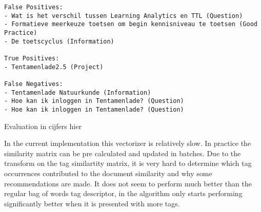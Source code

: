 \begin{lstlisting}
False Positives:
- Wat is het verschil tussen Learning Analytics en TTL (Question)
- Formatieve meerkeuze toetsen om begin kennisniveau te toetsen (Good Practice)
- De toetscyclus (Information)

True Positives:
- Tentamenlade2.5 (Project)

False Negatives:
- Tentamenlade Natuurkunde (Information)
- Hoe kan ik inloggen in Tentamenlade? (Question)
- Hoe kan ik inloggen in Tentamenlade? (Question)
\end{lstlisting}

Evaluation in cijfers hier

In the current implementation this vectorizer is relatively slow. In practice the similarity matrix can be pre calculated and updated in batches. Due to the transform on the tag similartity matrix, it is very hard to determine which tag occurrences contributed to the document similarity and why some recommendations are made. It does not seem to perform much better than the regular bag of words tag descriptor, in \citeauthor{zhou2011web} the algorithm only starts performing significantly better when it is presented with more tags.
